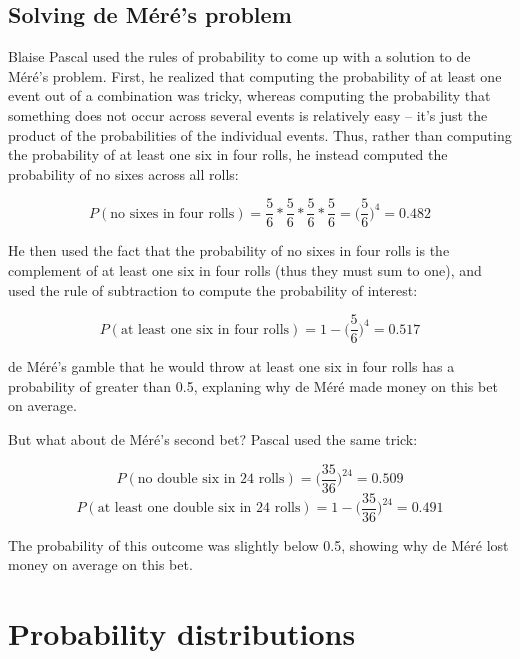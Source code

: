 \documentclass[12pt,]{book}
\theoremstyle{definition}
\theoremstyle{definition}
\theoremstyle{definition}
\theoremstyle{remark}
\begin{document}
\hypertarget{solving-de-muxe9ruxe9s-problem}{%
\subsection{Solving de Méré's problem}\label{solving-de-muxe9ruxe9s-problem}}

Blaise Pascal used the rules of probability to come up with a solution to de Méré's problem. First, he realized that computing the probability of at least one event out of a combination was tricky, whereas computing the probability that something does not occur across several events is relatively easy -- it's just the product of the probabilities of the individual events. Thus, rather than computing the probability of at least one six in four rolls, he instead computed the probability of no sixes across all rolls:

\[
P(\text{no sixes in four rolls}) = \frac{5}{6}*\frac{5}{6}*\frac{5}{6}*\frac{5}{6}=\bigg(\frac{5}{6}\bigg)^4=0.482
\]

He then used the fact that the probability of no sixes in four rolls is the complement of at least one six in four rolls (thus they must sum to one), and used the rule of subtraction to compute the probability of interest:

\[
P(\text{at least one six in four rolls}) = 1 - \bigg(\frac{5}{6}\bigg)^4=0.517
\]

de Méré's gamble that he would throw at least one six in four rolls has a probability of greater than 0.5, explaning why de Méré made money on this bet on average.

But what about de Méré's second bet? Pascal used the same trick:

\[
P(\text{no double six in 24 rolls}) = \bigg(\frac{35}{36}\bigg)^{24}=0.509
\]
\[
P(\text{at least one double six in 24 rolls}) = 1 - \bigg(\frac{35}{36}\bigg)^{24}=0.491
\]

The probability of this outcome was slightly below 0.5, showing why de Méré lost money on average on this bet.

\hypertarget{probability-distributions}{%
\section{Probability distributions}\label{probability-distributions}}
\end{document}
